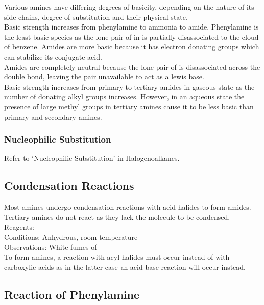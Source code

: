 \documentclass[../main]{subfiles}
\begin{document}
	Various amines have differing degrees of basicity, depending on the nature of its side chains, degree of substitution and their physical state. \\

	Basic strength increases from phenylamine to ammonia to amide. Phenylamine is the least basic species as the lone pair of  in  is partially disassociated to the  cloud of benzene. Amides are more basic because it has electron donating  groups which can stabilize its conjugate acid. \\

	Amides are completely neutral because the lone pair of  is disassociated across the  double bond, leaving the  pair unavailable to act as a lewis base. \\

	Basic strength increases from primary to tertiary amides in gaseous state as the number of  donating alkyl groups increases. However, in an aqueous state the presence of large methyl groups in tertiary amines cause it to be less basic than primary and secondary amines. \\

	\subsubsection{Nucleophilic Substitution}

	Refer to `Nucleophilic Substitution' in Halogenoalkanes.

	\subsection{Condensation Reactions}

	Most amines undergo condensation reactions with acid halides to form amides. Tertiary amines do not react as they lack the  molecule to be condensed. \\

	Reagents:  \\
	Conditions: Anhydrous, room temperature \\
	Observations: White fumes of  \\

	To form amines, a reaction with acyl halides must occur instead of with carboxylic acids as in the latter case an acid-base reaction will occur instead. \\

	\subsection{Reaction of Phenylamine}
\end{document}
